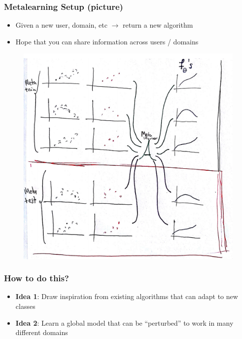 \documentclass[10pt,mathserif]{beamer}
\begin{document}
\begin{frame}
  \frametitle{Metalearning Setup (picture)}
\begin{itemize}
\item Given a new user, domain, etc $\rightarrow$ return a new algorithm
\item Hope that you can share information across users / domains
\end{itemize}
 \begin{figure}[ht]
   \centering
   \includegraphics[width=0.45\paperwidth]{figure/metalearning_setup_curves}
   \caption{\label{fig:metalearning_setup_curves} }
 \end{figure}
\end{frame}

\begin{frame}
  \frametitle{How to do this?}
  \begin{itemize}
  \item \textbf{Idea 1}: Draw inspiration from existing algorithms that can
    adapt to new classes
  \item \textbf{Idea 2}: Learn a global model that can be ``perturbed'' to work
    in many different domains
  \end{itemize}
\end{frame}
\end{document}
